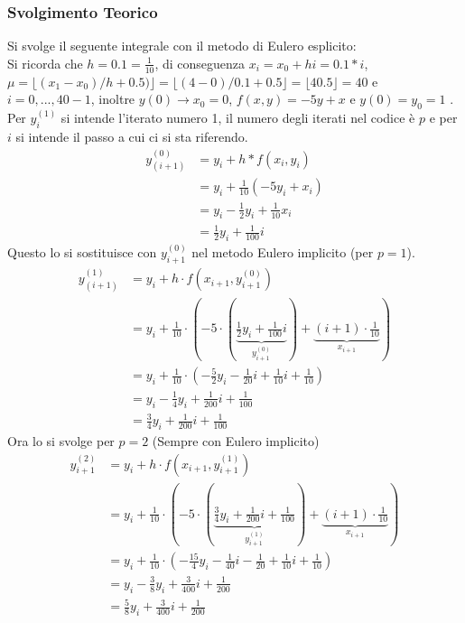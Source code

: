 \documentclass[11pt]{article}
\begin{document}
\subsubsection{Svolgimento Teorico}
Si svolge il seguente integrale con il metodo di Eulero esplicito:\\
Si ricorda che $h=0.1=\frac{1}{10}$, di conseguenza $x_i=x_0+hi=0.1*i$, $\mu= \lfloor (x_1-x_0)/h+0.5) \rfloor = \lfloor(4-0)/0.1+0.5\rfloor=\lfloor40.5\rfloor=40$ e $i=0,...,40-1$, inoltre $y(0) \to x_0=0$, $f(x,y)=-5y+x$ e $y(0)=y_0=1$ . Per $y_i^{(1)}$ si intende l'iterato numero 1, il numero degli iterati nel codice è $p$ e per $i$ si intende il passo a cui ci si sta riferendo.
\begin{align*}
y_{(i+1)}^{(0)}&=y_i+h*f(x_i,y_i)\\
&=y_i+\frac{1}{10}(-5y_i+x_i)\\
&=y_i-\frac{1}{2}y_i+\frac{1}{10}x_i\\
&=\frac{1}{2}y_i+\frac{1}{100}i
\end{align*}
Questo lo si sostituisce con $y_{i+1}^{(0)}$ nel metodo Eulero implicito (per $p=1$).
\begin{align*}
	y_{(i+1)}^{(1)}&=y_i+h\cdot f(x_{i+1},y_{i+1}^{(0)})\\
	&=y_i+\frac{1}{10}\cdot (-5\cdot (\underbrace{\frac{1}{2}y_i+\frac{1}{100}i}_{y^{(0)}_{i+1}})+\underbrace{(i+1) \cdot\frac{1}{10}}_{x_{i+1}})\\
	&=y_i+ \frac{1}{10}\cdot(-\frac{5}{2}y_i-\frac{1}{20}i+\frac{1}{10}i+\frac{1}{10})\\
	&=y_i-\frac{1}{4}y_i+\frac{1}{200}i+\frac{1}{100}\\
	&=\frac{3}{4}y_i+\frac{1}{200}i+\frac{1}{100}
\end{align*}
Ora lo si svolge per $p=2$ (Sempre con Eulero implicito)
\begin{align*}
	y_{i+1}^{(2)}&=y_i+h\cdot f(x_{i+1},y_{i+1}^{(1)})\\
	&=y_i+\frac{1}{10}\cdot (-5\cdot (\underbrace{\frac{3}{4}y_i+\frac{1}{200}i+\frac{1}{100}}_{y^{(1)}_{i+1}})+\underbrace{(i+1) \cdot\frac{1}{10}}_{x_{i+1}})\\
	&=y_i+\frac{1}{10}\cdot (-\frac{15}{4}y_i-\frac{1}{40}i-\frac{1}{20}+\frac{1}{10}i+\frac{1}{10})\\
	&=y_i -\frac{3}{8}y_i+\frac{3}{400}i+\frac{1}{200}\\
	&=\frac{5}{8}y_i+\frac{3}{400}i+\frac{1}{200}
\end{align*}
\end{document}
